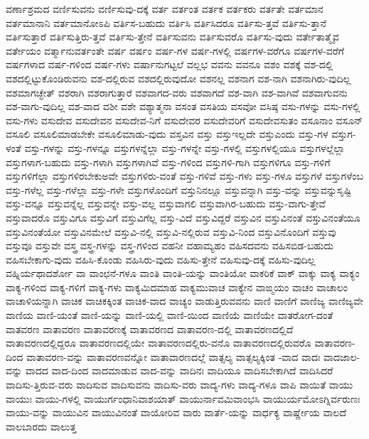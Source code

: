{ವರ್ಣಾಶ್ರಮದ
ವರ್ಣಿಸುವನು
ವರ್ಣಿಸುವು-ದಕ್ಕೆ
ವರ್ತ
ವರ್ತಂತ
ವರ್ತಕ
ವರ್ತಕರು
ವರ್ತತೇ
ವರ್ತಮಾನ
ವರ್ತಮಾನಾನಿ
ವರ್ತಮಾನೋಽಪಿ
ವರ್ತಿಸ-ಬಹುದು
ವರ್ತಿಸಿ
ವರ್ತಿಸಿದರೂ
ವರ್ತಿಸು-ತ್ತವೆ
ವರ್ತಿಸು-ತ್ತಾನೆ
ವರ್ತಿಸುತ್ತಾರೆ
ವರ್ತಿಸುತ್ತಿರು-ತ್ತವೆ
ವರ್ತಿಸು-ತ್ತೇನೆ
ವರ್ತಿಸುವನು
ವರ್ತಿಸುವರೊ
ವರ್ತಿಸು-ವುದು
ವರ್ತೇತಾತ್ಮೈವ
ವರ್ತೇಯಂ
ವರ್ತ್ಮಾನುವರ್ತಂತೇ
ವರ್ಷ
ವರ್ಷಂ
ವರ್ಷ-ಗಳ
ವರ್ಷ-ಗಳಲ್ಲಿ
ವರ್ಷಗಳ-ವರೆಗೂ
ವರ್ಷಗಳ-ವರೆಗೆ
ವರ್ಷಗಳಾದ
ವರ್ಷ-ಗಳಿಂದ
ವರ್ಷ-ಗಳು
ವರ್ಷಾನುಗಟ್ಟಲೆ
ವಲ್ಲಭ
ವವನು
ವವನೂ
ವಶಂ
ವಶಕ್ಕೆ
ವಶ-ದಲ್ಲಿ
ವಶದಲ್ಲಿಟ್ಟುಕೊಂಡಿರುವನು
ವಶ-ದಲ್ಲಿರುವ
ವಶದಲ್ಲಿರುವುದೋ
ವಶನಲ್ಲ
ವಶನಾಗ
ವಶ-ನಾಗಿ
ವಶನಾಗಿರು-ವುದಿಲ್ಲ
ವಶಮಾಗಚ್ಛೇತ್
ವಶರಾಗಿ
ವಶರಾಗುತ್ತಾರೆ
ವಶವಾಗದ-ವರು
ವಶವಾಗದೆ
ವಶ-ವಾಗಿ
ವಶ-ವಾಗಿವೆ
ವಶವಾಗುವನು
ವಶ-ವಾಗು-ವುದಿಲ್ಲ
ವಶ-ವಾದ
ವಶೀ
ವಶೇ
ವಶ್ಯಾತ್ಮನಾ
ವಸಂತ
ವಸತಿಯ
ವಸವೋ
ವಸಿಷ್ಠ
ವಸು-ಗಳನ್ನು
ವಸು-ಗಳಲ್ಲಿ
ವಸು-ಗಳು
ವಸುದೇವ
ವಸುದೇವನ
ವಸುದೇವ-ನಿಗೆ
ವಸುದೇವರ
ವಸುದೇವರಿಗೆ
ವಸುದೇವಸುತಂ
ವಸೂನಾಂ
ವಸೂನ್
ವಸೂಲಿ
ವಸೂಲಿಮಾಡಬೇಕೇ
ವಸೂಲಿಮಾಡು-ವುದು
ವಸ್ತವಿನ
ವಸ್ತು
ವಸ್ತುಇಲ್ಲದೇ
ವಸ್ತುಎಂದು
ವಸ್ತು-ಗಳ
ವಸ್ತುಗ-ಳಂತೆ
ವಸ್ತು-ಗಳನ್ನು
ವಸ್ತು-ಗಳನ್ನೂ
ವಸ್ತುಗಳನ್ನೆಲ್ಲಾ
ವಸ್ತು-ಗಳನ್ನೇ
ವಸ್ತು-ಗಳಲ್ಲಿ
ವಸ್ತುಗಳಲ್ಲಿಯೂ
ವಸ್ತುಗಳಲ್ಲೆಲ್ಲಾ
ವಸ್ತುಗಳಾಗ-ಬಹುದು
ವಸ್ತು-ಗಳಾಗಿ
ವಸ್ತುಗಳಾಗಿವೆ
ವಸ್ತು-ಗಳಿಂದ
ವಸ್ತುಗಳಿ-ಗಾಗಿ
ವಸ್ತುಗಳಿಗೂ
ವಸ್ತು-ಗಳಿಗೆ
ವಸ್ತುಗಳಿಗೆಲ್ಲಾ
ವಸ್ತುಗಳಿರಬೇಕುಅವೇ
ವಸ್ತುಗಳಿರು-ವಂತೆ
ವಸ್ತು-ಗಳಿವೆ
ವಸ್ತು-ಗಳು
ವಸ್ತು-ಗಳೂ
ವಸ್ತುಗಳೆ
ವಸ್ತುಗಳೆಂಬ
ವಸ್ತು-ಗಳೆಲ್ಲ
ವಸ್ತು-ಗಳೆಲ್ಲಾ
ವಸ್ತು-ಗಳೇ
ವಸ್ತುಗಳೊಂದಿಗೆ
ವಸ್ತುನಿನಲ್ಲೂ
ವಸ್ತುವನ್ನಾಗಿ
ವಸ್ತು-ವನ್ನು
ವಸ್ತುವನ್ನುಸೃಷ್ಟಿ
ವಸ್ತು-ವನ್ನೂ
ವಸ್ತುವನ್ನೆಲ್ಲ
ವಸ್ತುವನ್ನೇ
ವಸ್ತು-ವಲ್ಲ
ವಸ್ತುವಾಗಲಿ
ವಸ್ತುವಾಗಿರ-ಬಹುದು
ವಸ್ತು-ವಾಗು-ತ್ತೇವೆ
ವಸ್ತುವಾದರೊ
ವಸ್ತುವಿಗೂ
ವಸ್ತುವಿಗೆ
ವಸ್ತುವಿಗೆಲ್ಲ
ವಸ್ತು-ವಿದೆ
ವಸ್ತುವಿದ್ದರೆ
ವಸ್ತುವಿನ
ವಸ್ತುವಿನಂತೆ
ವಸ್ತುವಿನಂತೆಯೂ
ವಸ್ತುವಿನಂತೆಯೋ
ವಸ್ತುವಿನಮೇಲೆ
ವಸ್ತುವಿ-ನಲ್ಲಿ
ವಸ್ತುವಿ-ನಲ್ಲಿರುವ
ವಸ್ತುವಿ-ನಿಂದ
ವಸ್ತುವಿನೊಂದಿಗೆ
ವಸ್ತುವು
ವಸ್ತುವೂ
ವಸ್ತುವೇ
ವಸ್ತ್ರ
ವಸ್ತ್ರ-ಗಳನ್ನು
ವಸ್ತ್ರ-ಗಳಿಂದ
ವಹನೀ
ವಹಾಮ್ಯಹಂ
ವಹಿಸದವನು
ವಹಿಸಬಿಡ-ಬಹುದು
ವಹಿಸಬೇಕಾಗು-ವುದು
ವಹಿಸಿ-ಕೊಂಡು
ವಹಿಸಿರು-ವುದು
ವಹಿಸು-ತ್ತೇನೆ
ವಹಿಸುವು-ದಕ್ಕೆ
ವಹಿಸು-ವುದಿಲ್ಲ
ವಹ್ನಿರ್ಯಥಾದರ್ಶೋ
ವಾ
ವಾಂಛನೆ-ಗಳೂ
ವಾಂತಿ
ವಾಂತಿ-ಯನ್ನು
ವಾಂತಿಯೋ
ವಾಕರಿಕೆ
ವಾಕ್
ವಾಕ್ಕು
ವಾಕ್ಯ
ವಾಕ್ಯಂ
ವಾಕ್ಯ-ಗಳಿಂದ
ವಾಕ್ಯ-ಗಳಿಗೆ
ವಾಕ್ಯ-ಗಳು
ವಾಕ್ಯಮಿದಮಾಹ
ವಾಕ್ಯಮುವಾಚ
ವಾಕ್ಯೇನ
ವಾಙ್ಮಯಂ
ವಾಚಂ
ವಾಚಾಲಂ
ವಾಚಾಳಿಯನ್ನಾಗಿ
ವಾಚಿಕ
ವಾಚಿಕಕ್ಕಿಂತ
ವಾಚಿಕ-ವಾದ
ವಾಚ್ಯಂ
ವಾಡುತ್ತಿರುವವನು
ವಾಣಿ
ವಾಣಿಗೆ
ವಾಣಿಜ್ಯ
ವಾಣಿಜ್ಯವೇ
ವಾಣಿಯ
ವಾಣಿ-ಯಂತೆ
ವಾಣಿ-ಯನ್ನು
ವಾಣಿ-ಯಲ್ಲಿ
ವಾಣಿ-ಯಿಂದ
ವಾಣಿಯೆ
ವಾಣಿಯೇ
ವಾತರೋಗ-ದಂತೆ
ವಾತವರಣ
ವಾತಾವರಣ
ವಾತಾವರಣಕ್ಕೆ
ವಾತಾವರಣದ
ವಾತಾವರಣ-ದಲ್ಲಿ
ವಾತಾವರಣದಲ್ಲಿದೆ
ವಾತಾವರಣದಲ್ಲಿದ್ದರೂ
ವಾತಾವರಣದಲ್ಲಿಯೇ
ವಾತಾವರಣದಲ್ಲಿರು-ವನೊ
ವಾತಾವರಣದಲ್ಲಿರುವರೊ
ವಾತಾವರಣ-ದಿಂದ
ವಾತಾವರಣ-ವನ್ನು
ವಾತಾವರಣವನ್ನೋ
ವಾತಾವಾರಣದಲ್ಲೆ
ವಾತ್ಸಲ್ಯ
ವಾತ್ಸಲ್ಯಕ್ಕಿಂತ
-ವಾದ
ವಾದಃ
ವಾದಜಾಲ-ವನ್ನು
ವಾದದ
ವಾದ-ದಿಂದ
ವಾದಮಾಡುವ
ವಾದ-ವನ್ನು
ವಾದಿನಃ
ವಾದಿಯೂ
ವಾದಿಸಬೇಕಾಗಿದೆ
ವಾದಿಸಿದರೆ
ವಾದಿಸು-ತ್ತಿರುವ-ವರು
ವಾದಿಸುವ
ವಾದಿಸುವನು
ವಾದಿಸು-ವರು
ವಾದ್ಯ-ಗಳು
ವಾದ್ಯ-ಗಳೂ
ವಾಪಿ
ವಾಯಿತೆ
ವಾಯು
ವಾಯುಃ
ವಾಯು-ಗಳಲ್ಲಿ
ವಾಯುರ್ಗಂಧಾನಿವಾಶಯಾತ್
ವಾಯುರ್ನಾವಮಿವಾಂಭಸಿ
ವಾಯುರ್ಯಮೋಽಗ್ನಿರ್ವರುಣಃ
ವಾಯು-ವನ್ನು
ವಾಯುವಿನ
ವಾಯುವಿನಂತೆ
ವಾಯೋರಿವ
ವಾರು
ವಾರ್ತೆ-ಯನ್ನು
ವಾರ್ಧಕ್ಯ
ವಾರ್ಷ್ಣೇಯ
ವಾಲದೆ
ವಾಲಬಾರದು
ವಾಲುತ್ತ
}
